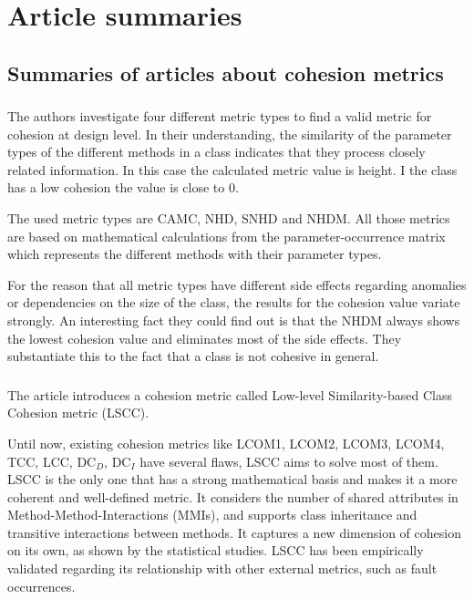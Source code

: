 \section{Article summaries}
\label{article_summaries}
\subsection{Summaries of articles about cohesion metrics}
    \subsubsection{ \cite{s118_cohesion}}
    
        The authors investigate four different metric types to find a valid metric for cohesion at design level. In their understanding, the similarity of the parameter types of the different methods in a class indicates that they process closely related information. In this case the calculated metric value is height. I the class has a low cohesion the value is close to 0.

        The used metric types are CAMC, NHD, SNHD and NHDM. All those metrics are based on mathematical calculations from the parameter-occurrence matrix which represents the different methods with their parameter types. 
        
        For the reason that all metric types have different side effects regarding anomalies or dependencies on the size of the class, the results for the cohesion value variate strongly. An interesting fact they could find out is that the NHDM always shows the lowest cohesion value and eliminates most of the side effects. They substantiate this to the fact that a class is not cohesive in general.


    \subsubsection{ \cite{s12_cohesion}}
    \label{article_summary_s12}
    
        The article introduces a cohesion metric called Low-level Similarity-based Class Cohesion metric (LSCC).
        
        Until now, existing cohesion metrics like LCOM1, LCOM2, LCOM3, LCOM4, TCC, LCC, DC$_D$, DC$_I$ have several flaws, LSCC aims to solve most of them. LSCC is the only one that has a strong mathematical basis and makes it a more coherent and well-defined metric. It considers the number of shared attributes in Method-Method-Interactions (MMIs), and supports class inheritance and transitive interactions between methods. It captures a new dimension of cohesion on its own, as shown by the statistical studies. LSCC has been empirically validated regarding its relationship with other external metrics, such as fault occurrences.
        
